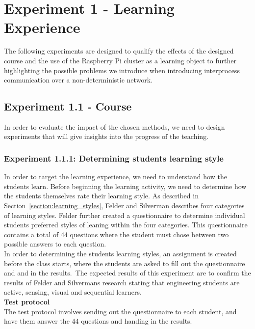 \section{Experiment 1 - Learning Experience}
The following experiments are designed to qualify the effects of the designed course and the use of the Raspberry Pi cluster as a learning object to further highlighting the possible problems we introduce when introducing interprocess communication over a non-deterministic network.

\subsection*{Experiment 1.1 - Course}
In order to evaluate the impact of the chosen methods, we need to design experiments that will give insights into the progress of the teaching. 

\subsubsection*{Experiment 1.1.1: Determining students learning style}
\label{sec:exp1_1_1_learningstyle}
In order to target the learning experience, we need to understand how the students learn. Before beginning the learning activity, we need to determine how the students themselves rate their learning style. As described in Section~\ref{section:learning_styles}, Felder and Silverman describes four categories of learning styles. Felder further created a questionnaire to determine individual students preferred styles of leaning within the four categories. This questionnaire contains a total of 44 questions where the student must chose between two possible answers to each question. \\

\noindent In order to determining the students learning styles, an assignment is created before the class starts, where the students are asked to fill out the questionnaire and and in the results. The expected results of this experiment are to confirm the results of Felder and Silvermans research stating that engineering students are active, sensing, visual and sequential learners.\\

\noindent\textbf{Test protocol} \\
The test protocol involves sending out the questionnaire to each student, and have them answer the 44 questions and handing in the results. \\

